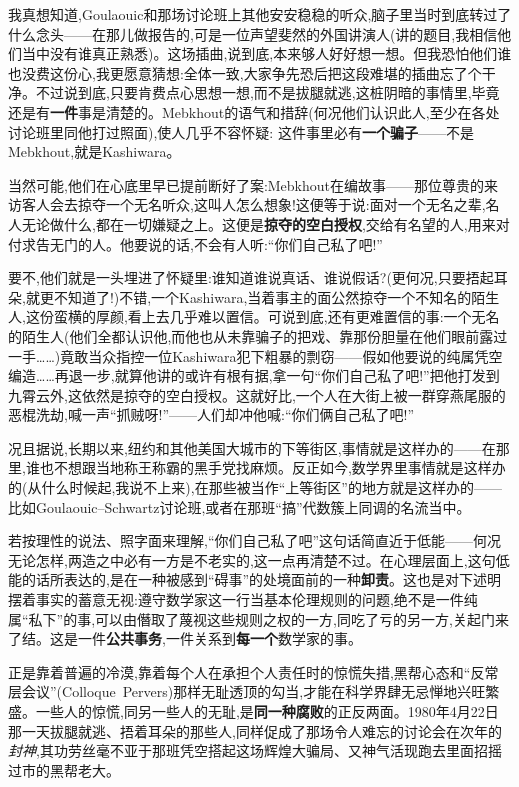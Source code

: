 我真想知道,Goulaouic和那场讨论班上其他安安稳稳的听众,脑子里当时到底转过了什么念头——在那儿做报告的,可是一位声望斐然的外国讲演人(讲的题目,我相信他们当中没有谁真正熟悉)。这场插曲,说到底,本来够人好好想一想。但我\dmark{}恐怕他们谁也没费这份心,我更愿意猜想:全体一致,大家争先恐后把这段难堪的插曲忘了个干净。不过说到底,只要肯费点心思想一想,而不是拔腿就逃,这桩阴暗的事情里,毕竟还是有\textbf{一件}事是清楚的。Mebkhout的语气和措辞(何况他们认识此人,至少在各处讨论班里同他打过照面),使人几乎不容怀疑:
这件事里必有\textbf{一个骗子}——不是Mebkhout,就是Kashiwara。

当然可能,他们在心底里早已提前断好了案:Mebkhout在编故事——那位尊贵的来访客人会去掠夺一个无名听众,这叫人怎么想象!这便等于说:面对一个无名之辈,名人无论做什么,都在一切嫌疑之上。这便是\textbf{掠夺的空白授权},交给有名望的人,用来对付求告无门的人。他要说的话,不会有人听:“你们自己私了吧!”

要不,他们就是一头埋进了怀疑里:谁知道谁说真话、谁说假话?(更何况,只要捂起耳朵,就更不知道了!)不错,一个Kashiwara,当着事主的面公然掠夺一个不知名的陌生人,这份蛮横的厚颜,看上去几乎难以置信。可说到底,还有更难置信的事:一个无名的陌生人(他们全都认识他,而他也从未靠骗子的把戏、靠那份胆量在他们眼前露过一手……)竟敢当众指控一位Kashiwara犯下粗暴的剽窃——假如他要说的纯属凭空编造……再退一步,就算他讲的或许有根有据,拿一句“你们自己私了吧!”把他打发到九霄云外,这依然是掠夺的空白授权。这就好比,一个人在大街上被一群穿燕尾服的恶棍洗劫,喊一声“抓贼呀!”——人们却冲他喊:“你们俩自己私了吧!”

况且据说,长期以来,纽约和其他美国大城市的下等街区,事情就是这样办的——在那里,谁也不想跟当地称王称霸的黑手党找麻烦。反正如今,数学界里事情就是这样办的(从什么时候起,我说不上来),在那些被当作“上等街区”的地方就是这样办的——比如Goulaouic--Schwartz讨论班,或者在那班“搞”代数簇上同调的名流当中。

\pmark{}若按理性的说法、照字面来理解,“你们自己私了吧”这句话简直近于低能——何况无论怎样,两造之中必有一方是不老实的,这一点再清楚不过。在心理层面上,这句低能的话所表达的,是在一种被感到“碍事”的处境面前的一种\textbf{卸责}。这也是对下述明摆着事实的蓄意无视:遵守数学家这一行当基本伦理规则的问题,绝不是一件纯属“私下”的事,可以由僭取了蔑视这些规则之权的一方,同吃了亏的另一方,关起门来了结。这是一件\textbf{公共事务},一件关系到\textbf{每一个}数学家的事。

正是靠着普遍的冷漠,靠着每个人在承担个人责任时的惊慌失措,黑帮心态和“反常层会议”(Colloque~Pervers)那样无耻透顶的勾当,才能在科学界肆无忌惮地兴旺繁盛。一些人的惊慌,同另一些人的无耻,是\textbf{同一种腐败}的正反两面。1980年4月22日那一天拔腿就逃、捂着耳朵的那些人,同样促成了那场令人难忘的讨论会在次年的\emph{封神},其功劳丝毫不亚于那班凭空搭起这场辉煌大骗局、又神气活现跑去里面招摇过市的黑帮老大。

